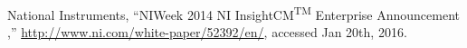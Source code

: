 \begin{thebibliography}{10}
National Instruments, ``NIWeek 2014 NI InsightCM\textsuperscript{TM} Enterprise Announcement
,'' \url{http://www.ni.com/white-paper/52392/en/}, accessed Jan 20th, 2016.




\end{thebibliography}



